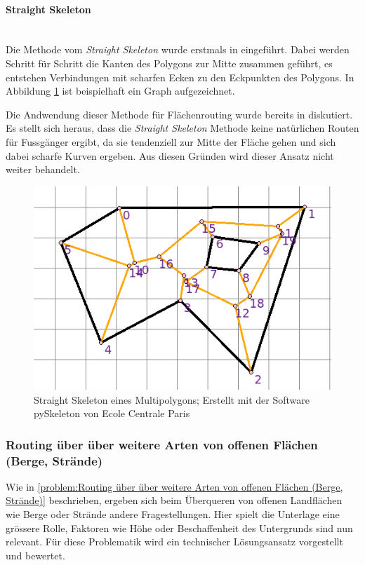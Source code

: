 \paragraph{Straight Skeleton}~\\

Die Methode vom \emph{Straight Skeleton} wurde erstmals in \cite{aichholzer_skeleton} eingeführt. Dabei werden Schritt für Schritt die Kanten des Polygons zur Mitte zusammen geführt, es entstehen Verbindungen mit scharfen Ecken zu den Eckpunkten des Polygons. In Abbildung \ref{fig:skeleton_example} ist beispielhaft ein Graph aufgezeichnet.

Die Andwendung dieser Methode für Flächenrouting wurde bereits in \cite{graser_visibility_graph} diskutiert. Es stellt sich heraus, dass die \emph{Straight Skeleton} Methode keine natürlichen Routen für Fussgänger ergibt, da sie tendenziell zur Mitte der Fläche gehen und sich dabei scharfe Kurven ergeben. Aus diesen Gründen wird dieser Ansatz nicht weiter behandelt.

\begin{figure}[th]
\centering
\includegraphics[width=0.7\linewidth]{technicalreport/img/skeleton_example.png}
\caption[Straight Skeleton Beispiel]{Straight Skeleton eines Multipolygons; Erstellt mit der Software pySkeleton von Ecole Centrale Paris}
\label{fig:skeleton_example}
\end{figure}


\subsubsection{Routing über über weitere Arten von offenen Flächen (Berge, Strände)}
\label{subsub:Routing über über weitere Arten von offenen Flächen (Berge, Strände)}

Wie in \ref{problem:Routing über über weitere Arten von offenen Flächen (Berge, Strände)} beschrieben, ergeben sich beim Überqueren von offenen Landflächen wie Berge oder Strände andere Fragestellungen. Hier spielt die Unterlage eine grössere Rolle, Faktoren wie Höhe oder Beschaffenheit des Untergrunds sind nun relevant. Für diese Problematik wird ein technischer Lösungsansatz vorgestellt und bewertet.

